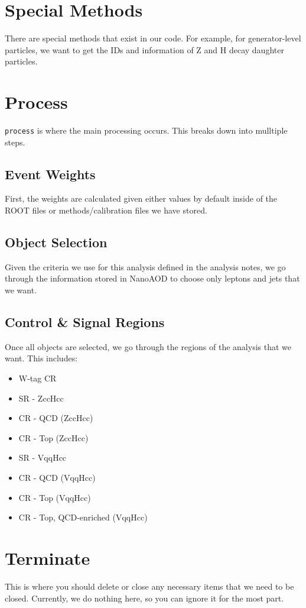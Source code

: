 \section{Special Methods}

There are special methods that exist in our code. For example, for generator-level particles, we want to get the IDs and information of Z and H decay daughter particles. 

\section{Process}
\verb|process| is where the main processing occurs. This breaks down into mulltiple steps.

\subsection{Event Weights}
First, the weights are calculated given either values by default inside of the ROOT files or methods/calibration files we have stored.

\subsection{Object Selection}
Given the criteria we use for this analysis defined in the analysis notes, we go through the information stored in NanoAOD to choose only leptons and jets that we want.

\subsection{Control \& Signal Regions}
Once all objects are selected, we go through the regions of the analysis that we want. This includes:

\begin{itemize}
    \item W-tag CR
    \item SR - ZccHcc
    \item CR - QCD (ZccHcc)
    \item CR - Top (ZccHcc)
    \item SR - VqqHcc
    \item CR - QCD (VqqHcc)
    \item CR - Top (VqqHcc)
    \item CR - Top, QCD-enriched (VqqHcc)
\end{itemize}

\section{Terminate}
This is where you should delete or close any necessary items that we need to be closed. Currently, we do nothing here, so you can ignore it for the most part.